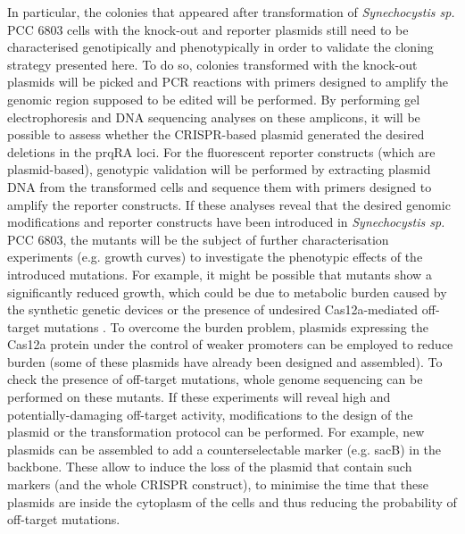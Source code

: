 In particular, the colonies that appeared after transformation of \textit{Synechocystis sp.} PCC 6803 cells with the knock-out and reporter plasmids still need to be characterised genotipically and phenotypically in order to validate the cloning strategy presented here. To do so, colonies transformed with the knock-out plasmids will be picked and PCR reactions with primers designed to amplify the genomic region supposed to be edited will be performed. By performing gel electrophoresis and DNA sequencing analyses on these amplicons, it will be possible to assess whether the CRISPR-based plasmid generated the desired deletions in the prqRA loci. For the fluorescent reporter constructs (which are plasmid-based), genotypic validation will be performed by extracting plasmid DNA from the transformed cells and sequence them with primers designed to amplify the reporter constructs. If these analyses reveal that the desired genomic modifications and reporter constructs have been introduced in \textit{Synechocystis sp.} PCC 6803, the mutants will be the subject of further characterisation experiments (e.g. growth curves) to investigate the phenotypic effects of the introduced mutations. For example, it might be possible that mutants show a significantly reduced growth, which could be due to metabolic burden caused by the synthetic genetic devices or the presence of undesired Cas12a-mediated off-target mutations . 
To overcome the burden problem, plasmids expressing the Cas12a protein under the control of weaker promoters can be employed to reduce burden (some of these plasmids have already been designed and assembled). 
To check the presence of off-target mutations, whole genome sequencing can be performed on these mutants. If these experiments will reveal high and potentially-damaging off-target activity, modifications to the design of the plasmid or the transformation protocol can be performed. For example, new plasmids can be assembled to add a counterselectable marker (e.g. sacB) in the backbone. These allow to induce the loss of the plasmid that contain such markers (and the whole CRISPR construct), to minimise the time that these plasmids are inside the cytoplasm of the cells and thus reducing the probability of off-target mutations. 

